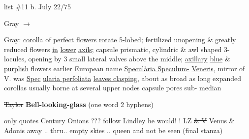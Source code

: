 \documentclass[a4paper]{article}
\begin{document}
\begin{minipage}{0.1\textwidth}
\Circled{\color{blue}{13}} 
\end{minipage}
\begin{minipage}{0.2\textwidth}
\color{blue}
\null list \#11
b. July 22/75
\end{minipage}
\begin{minipage}{0.7\textwidth}
\begin{flushright}
\color{blue}
\par
Gray
$\rightarrow$
\color{red}\Circled{\color{blue}{Venus's Looking-glass}}\par
\end{flushright}
\end{minipage}
\color{blue}
\vspace{0pt}
\begin{minipage}[t]{0.3\textwidth}
\setul{}{2pt}
Gray: \ul{corolla}
of \ul{perfect} \ul{flowers}
\ul{rotate} \ul{5-lobed};
fertilized
\ul{unopening} \&
greatly reduced
flowers \ul{in} \ul{lower}
\ul{axils}; capsule
prismatic, cylindric
\& awl shaped 3-
locules, opening
by 3 small lateral
valves
above the
middle; \ul{axillary}
\ul{blue} \& \ul{purplish} %
flowers earlier
European name
\setul{}{1pt}
\ul{Specul\`aria Speculum-} 
\ul{Veneris}, mirror of V.
\setul{}{2pt}
was \ul{Spec}
\setul{}{1pt}
\ul{ularia perfoliata}
\setul{}{2pt}
\ul{leaves clasping}, about as
broad as long expanded
corollas usually borne
at several upper nodes
capsule pores sub-
median

\sout{Taylor}
\color{red}
\textbf{Bell-looking-glass}
(one word
2 hyphens)

only
quotes Century
Onions ???
\color{blue}
follow Lindley
he would!
! LZ
\sout{\& V}
Venus \& Adonis
away .. thru..
empty skies .. queen
and not be seen
(final stanza)
\end{minipage}
\hfill
\end{document}
